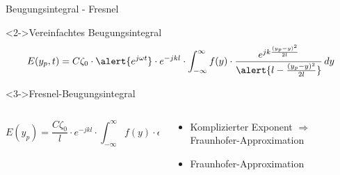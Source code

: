 \begin{frame}{Beugungsintegral - Fresnel}
    \begin{block}<2->{Vereinfachtes Beugungsintegral}
        \begin{equation*}
            E(y_p, t)
            =
            C\zeta_0 \cdot \alert{e^{j\omega t}} \cdot e^{-jkl} \cdot \int_{-\infty}^{\infty}f(y)\cdot\frac{e^{jk\frac{(y_p-y)^2}{2l}}}{\alert{l - \frac{(y_p-y)^2}{2l}}} \,dy
        \end{equation*}
    \end{block}
    \begin{exampleblock}<3->{Fresnel-Beugungsintegral}
        \begin{columns}
            \begin{column}{0.6\textwidth}
                \vspace*{\baselineskip}
                \begin{equation*}
                    E(y_p)
                    =
                    \frac{C\zeta_0}{l} \cdot e^{-jkl} \cdot \int_{-\infty}^{\infty}f(y)\cdot e^{jk\frac{(y_p^2 - 2y_py + y^2)}{2l}} \,dy
                \end{equation*}
                \vspace*{0.2\baselineskip}
            \end{column}
            \begin{column}{0.4\textwidth}
                \begin{itemize}
                    \item<4-> Komplizierter Exponent $\Rightarrow$ Fraunhofer-Approximation
                    \item<4-> Fraunhofer-Approximation
                \end{itemize}
            \end{column}
        \end{columns}
    \end{exampleblock}
\end{frame}

